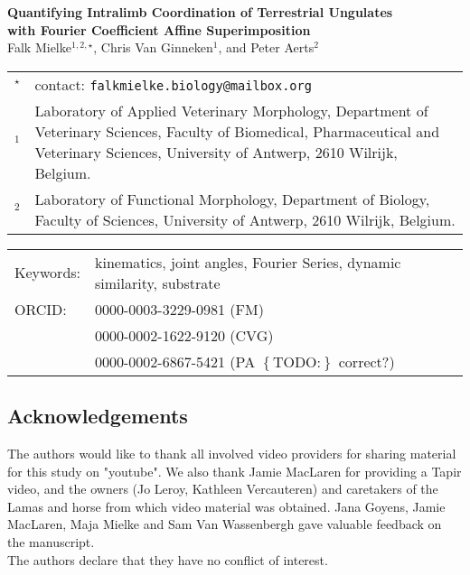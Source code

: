 \documentclass[10pt, a4paper]{article}
\newcommand{\todo}[1]{\colorbox{terracotta!30!yellow}{\footnotesize{$\left\lbrace\text{TODO:}\right\rbrace$ }#1\normalsize}}
\begin{document}
\setcounter{page}{1}

\thispagestyle{fancy} %





\begin{center}
\large{\textbf{Quantifying Intralimb Coordination of Terrestrial Ungulates \\with Fourier Coefficient Affine Superimposition}}
\smallskip\\\textsf{Falk Mielke$^{1,2,\star}$, Chris Van Ginneken$^{1}$, and Peter Aerts$^{2}$}
\end{center}


\vspace*{0.cm}
\begin{tabular}{ r  p{}}
$^{\star}$ & contact: \nolinkurl{falkmielke.biology@mailbox.org}
\\ $^{1}$ & Laboratory of Applied Veterinary Morphology, Department of Veterinary Sciences, Faculty of Biomedical, Pharmaceutical and Veterinary Sciences, University of Antwerp, 2610 Wilrijk, Belgium.
\\ $^{2}$ & Laboratory of Functional Morphology, Department of Biology, Faculty of Sciences, University of Antwerp, 2610 Wilrijk, Belgium.
\end{tabular}


\vspace*{0.cm}
\begin{tabular}{p{} p{}}
Keywords: & kinematics, joint angles, Fourier Series, dynamic similarity, substrate
\\ ORCID: & 0000-0003-3229-0981 (FM)
\\		  & 0000-0002-1622-9120 (CVG)
\\		  & 0000-0002-6867-5421 (PA \todo{correct?})

\end{tabular}

\subsection{Acknowledgements}
The authors would like to thank all involved video providers for sharing material for this study on "youtube". 
We also thank Jamie MacLaren for providing a Tapir video, and the owners (Jo Leroy, Kathleen Vercauteren) and caretakers of the Lamas and horse from which video material was obtained. 
Jana Goyens, Jamie MacLaren, Maja Mielke and Sam Van Wassenbergh gave valuable feedback on the manuscript.  
\bigskip\\
The authors declare that they have no conflict of interest.
\end{document}
